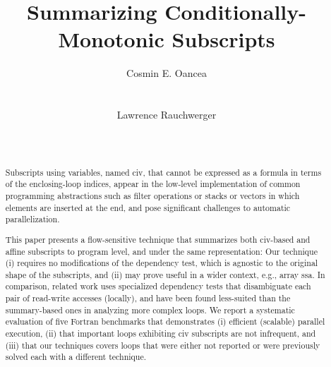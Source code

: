 \documentclass{sig-alternate}
\begin{document}


\title{ Summarizing Conditionally-Monotonic Subscripts}   


\author{
\alignauthor
Cosmin E. Oancea\\
       \\
       \\
\alignauthor
Lawrence Rauchwerger\\
       \\
       \\
}


\maketitle



\begin{abstract}

Subscripts using variables, named {\sc civ}, that cannot be expressed 
as a formula in terms of the enclosing-loop indices,  
appear in the low-level implementation of common programming abstractions 
such as filter operations or stacks or vectors in which elements are 
inserted at the end, and pose significant challenges to automatic
parallelization.

This paper presents a flow-sensitive technique that summarizes 
both {\sc civ}-based and affine subscripts to program level,
and under the same representation: Our technique (i) requires no 
modifications of the dependency test, which is agnostic to the 
original shape of the subscripts, and (ii) may prove useful
in a wider context, e.g., array {\sc ssa}. 
%
In comparison, related work uses specialized dependency tests that 
disambiguate each pair of read-write accesses (locally), and 
have been found less-suited than the summary-based ones in analyzing 
more complex loops. 
%
We report a systematic evaluation of five Fortran benchmarks that demonstrates 
  (i) efficient (scalable) parallel execution, 
 (ii) that important loops exhibiting {\sc civ} subscripts are not infrequent, and 
(iii) that our techniques covers loops that were either not reported or were 
        previously solved each with a different technique.
\end{abstract}
\end{document}
